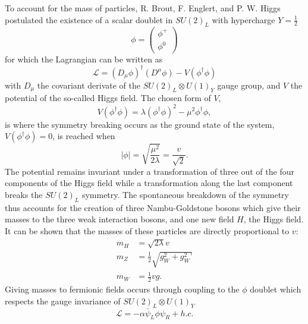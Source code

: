     To account for the mass of particles, R. Brout, F. Englert, and P. W. Higgs postulated the existence of a scalar doublet in $ SU(2)_L $ with hypercharge $ Y = \frac{1}{2} $
    \begin{equation}
      \phi = \left( \begin{matrix} \phi^+ \\ \phi^0 \end{matrix} \right)
    \end{equation}
    for which the Lagrangian can be written as
    \begin{equation}
      \mathcal{L} = \left( D_\mu \phi \right)^\dagger \left( D^\mu \phi \right) - V(\phi^\dagger \phi)
    \end{equation}
    with $ D_\mu $ the covariant derivate of the $ SU(2)_L \otimes U(1)_Y $ gauge group, and $ V $ the potential of the so-called Higgs field. The chosen form of $ V $,
    \begin{equation}
      V(\phi^\dagger \phi) = \lambda \left( \phi^\dagger \phi \right)^2 - \mu^2 \phi^\dagger \phi ,
    \end{equation}
    is where the symmetry breaking occurs as the ground state of the system, $ V(\phi^\dagger \phi) = 0 $, is reached when
    \begin{equation}
      \left| \phi \right| = \sqrt{\frac{\mu^2}{2 \lambda}} = \frac{v}{\sqrt{2}} .
    \end{equation}
    The potential remains invariant under a transformation of three out of the four components of the Higgs field while a transformation along the last component breaks the $ SU(2)_L $ symmetry. The spontaneous breakdown of the symmetry thus accounts for the creation of three Nambu-Goldstone bosons which give their masses to the three weak interaction bosons, and one new field $ H $, the Higgs field. It can be shown that the masses of these particles are directly proportional to $ v $:
    \begin{align}
      m_H & = \sqrt{2 \lambda} v \\
      m_Z & = \frac{1}{2} \sqrt{g_W^2 + g_W^2\text{'}} \\
      m_W & = \frac{1}{2} v g .
    \end{align}
    Giving masses to fermionic fields occurs through coupling to the $ \phi $ doublet which respects the gauge invariance of $ SU(2)_L \otimes U(1)_Y $
    \begin{equation}
      \mathcal{L} = - \alpha \bar{\psi}_L \phi \psi_R + h.c.
    \end{equation} \\

